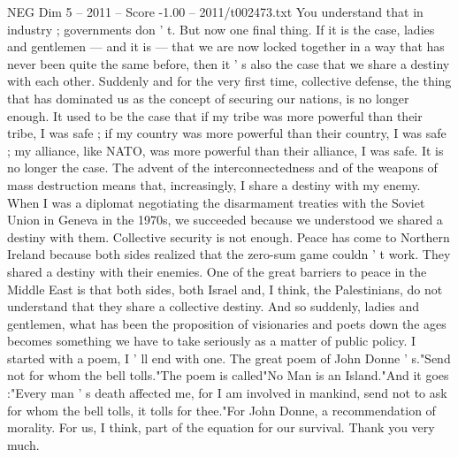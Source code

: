 \begin{textsample}{NEG Dim 5 – 2011 – Score -1.00 – 2011/t002473.txt}
You understand that in industry ; governments don ' t.
But now one final thing.
If it is the case, ladies and gentlemen — and it is — that we are now locked together in a way that has never been quite the same before, then it ' s also the case that we share a destiny with each other.
Suddenly and for the very first time, collective defense, the thing that has dominated us as the concept of securing our nations, is no longer enough.
It used to be the case that if my tribe was more powerful than their tribe, I was safe ; if my country was more powerful than their country, I was safe ; my alliance, like NATO, was more powerful than their alliance, I was safe.
It is no longer the case.
The advent of the interconnectedness and of the weapons of mass destruction means that, increasingly, I share a destiny with my enemy.
When I was a diplomat negotiating the disarmament treaties with the Soviet Union in Geneva in the 1970s, we succeeded because we understood we shared a destiny with them.
Collective security is not enough.
Peace has come to Northern Ireland because both sides realized that the zero-sum game couldn ' t work.
They shared a destiny with their enemies.
One of the great barriers to peace in the Middle East is that both sides, both Israel and, I think, the Palestinians, do not understand that they share a collective destiny.
And so suddenly, ladies and gentlemen, what has been the proposition of visionaries and poets down the ages becomes something we have to take seriously as a matter of public policy.
I started with a poem, I ' ll end with one.
The great poem of John Donne ' s."Send not for whom the bell tolls."The poem is called"No Man is an Island."And it goes :"Every man ' s death affected me, for I am involved in mankind, send not to ask for whom the bell tolls, it tolls for thee."For John Donne, a recommendation of morality.
For us, I think, part of the equation for our survival.
Thank you very much.

\end{textsample}
